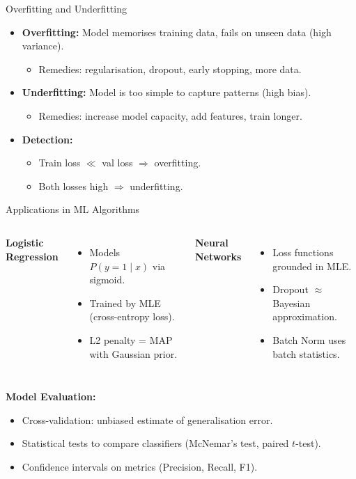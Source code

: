 \begin{frame}{Overfitting and Underfitting}
\begin{itemize}
    \item \textbf{Overfitting:} Model memorises training data, fails on unseen data (high variance).
    \begin{itemize}
        \item Remedies: regularisation, dropout, early stopping, more data.
    \end{itemize}
    \item \textbf{Underfitting:} Model is too simple to capture patterns (high bias).
    \begin{itemize}
        \item Remedies: increase model capacity, add features, train longer.
    \end{itemize}
    \item \textbf{Detection:}
    \begin{itemize}
        \item Train loss $\ll$ val loss $\Rightarrow$ overfitting.
        \item Both losses high $\Rightarrow$ underfitting.
    \end{itemize}
\end{itemize}
\end{frame}

\begin{frame}{Applications in ML Algorithms}
\begin{columns}[T]
\textbf{Logistic Regression}
\begin{itemize}
    \item Models $P(y=1 \mid x)$ via sigmoid.
    \item Trained by MLE (cross-entropy loss).
    \item L2 penalty = MAP with Gaussian prior.
\end{itemize}
\textbf{Neural Networks}
\begin{itemize}
    \item Loss functions grounded in MLE.
    \item Dropout $\approx$ Bayesian approximation.
    \item Batch Norm uses batch statistics.
\end{itemize}
\end{columns}
\vspace{8pt}
\textbf{Model Evaluation:}
\begin{itemize}
    \item Cross-validation: unbiased estimate of generalisation error.
    \item Statistical tests to compare classifiers (McNemar's test, paired $t$-test).
    \item Confidence intervals on metrics (Precision, Recall, F1).
\end{itemize}
\end{frame}

